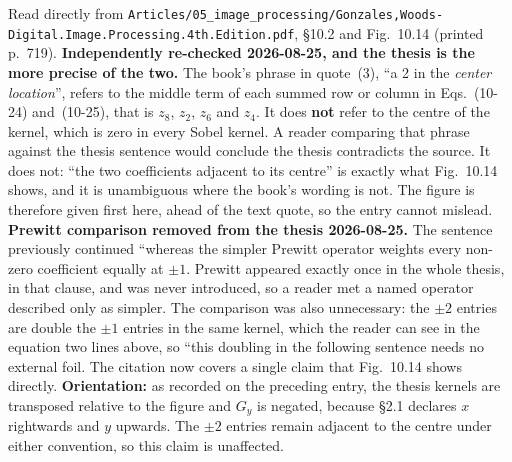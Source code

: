 \documentclass[11pt, a4paper]{article}
\begin{document}
\begin{Form}
  {Read directly from \texttt{\footnotesize Articles/05\_image\_processing/Gonzales,Woods-Digital.Image.Processing.4th.Edition.pdf}, \S10.2 and Fig.~10.14 (printed p.~719). \textbf{Independently re-checked 2026-08-25, and the thesis is the more precise of the two.} The book's phrase in quote~(3), ``a 2 in the \emph{center location}'', refers to the middle term of each summed row or column in Eqs.~(10-24) and~(10-25), that is $z_8$, $z_2$, $z_6$ and $z_4$. It does \textbf{not} refer to the centre of the kernel, which is zero in every Sobel kernel. A reader comparing that phrase against the thesis sentence would conclude the thesis contradicts the source. It does not: ``the two coefficients adjacent to its centre'' is exactly what Fig.~10.14 shows, and it is unambiguous where the book's wording is not. The figure is therefore given first here, ahead of the text quote, so the entry cannot mislead. \textbf{Prewitt comparison removed from the thesis 2026-08-25.} The sentence previously continued ``whereas the simpler Prewitt operator weights every non-zero coefficient equally at $\pm1$. Prewitt appeared exactly once in the whole thesis, in that clause, and was never introduced, so a reader met a named operator described only as simpler. The comparison was also unnecessary: the $\pm2$ entries are double the $\pm1$ entries in the same kernel, which the reader can see in the equation two lines above, so ``this doubling in the following sentence needs no external foil. The citation now covers a single claim that Fig.~10.14 shows directly. \textbf{Orientation:} as recorded on the preceding entry, the thesis kernels are transposed relative to the figure and $G_y$ is negated, because \S2.1 declares $x$ rightwards and $y$ upwards. The $\pm2$ entries remain adjacent to the centre under either convention, so this claim is unaffected.}


\end{Form}
\end{document}
